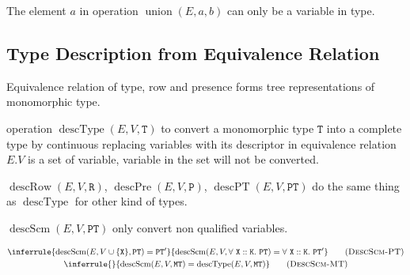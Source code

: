 \documentclass{report}
\newcommand{\code}{\mathtt}
\newcommand{\ruleTag}[1]{\label{#1}\tag{\textsc{#1}}}
\DeclareMathOperator{\union}{union}
\DeclareMathOperator{\describeScheme}{descScm}
\DeclareMathOperator{\describeType}{descType}
\DeclareMathOperator{\describeRow}{descRow}
\DeclareMathOperator{\describePresence}{descPre}
\DeclareMathOperator{\describePresenceWithType}{descPT}
\begin{document}
The element \(a\) in operation \(\union(E, a, b)\) can only be a variable in type.

\subsection{Type Description from Equivalence Relation}

Equivalence relation of type, row and presence forms tree representations of monomorphic type.

operation \(\describeType(E, V, \code{T})\) to convert a monomorphic type \(\code{T}\) into a complete type by continuous replacing variables with its descriptor in equivalence relation \(E\).\(V\) is a set of variable, variable in the set will not be converted.

\(\describeRow(E, V, \code{R})\), \(\describePresence(E, V, \code{P})\), \(\describePresenceWithType(E, V, \code{PT})\) do the same thing as \(\describeType\) for other kind of types.

\(\describeScheme(E, V, \code{PT})\) only convert non qualified variables.

\begin{gather}
\inferrule
{\describeScheme(E, V \cup \{\code{X}\}, \code{PT}) = \code{PT}'}
{\describeScheme(E, V, \forall\ \code{X} :: \code{K} .\ \code{PT}) = \forall\ \code{X} :: \code{K} .\ \code{PT}'}
\ruleTag{DescScm-PT}
\\
\inferrule
{}
{\describeScheme(E, V, \code{MT}) = \describeType(E, V, \code{MT})}
\ruleTag{DescScm-MT}
\end{gather}
\end{document}
